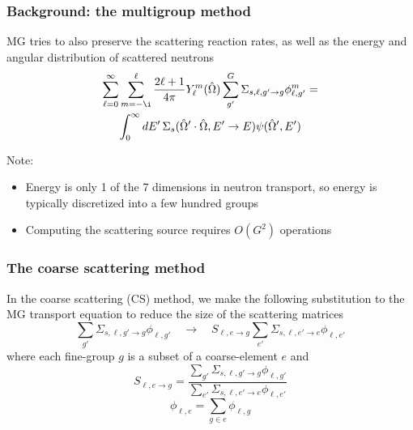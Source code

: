 \documentclass[xcolor=dvipsnames]{beamer}
\newlength{\wideitemsep}
\let\olditem\item
\renewcommand{\item}{\setlength{\itemsep}{\wideitemsep}\olditem}
\begin{document}
\begin{frame}
  \frametitle{Background: the multigroup method}

MG tries to also preserve the scattering reaction rates, as well as the energy and angular distribution of scattered neutrons
\begin{multline*}
 \sum_{\ell=0}^\infty \sum_{m=-\i}^\ell \frac{2 \ell + 1}{4 \pi} Y_\ell^m(\hat{\Omega}) \sum_{g'}^G \Sigma_{s,\ell, g' \to g} \phi_{\ell,g'}^m = \\ \int_0^\infty dE' \,\Sigma_s(\hat{\Omega}' \cdot \hat{\Omega},E' \to E) \psi(\hat{\Omega}',E')
\end{multline*}

Note:
\begin{itemize}
\item Energy is only 1 of the 7 dimensions in neutron transport, so energy is typically discretized into a few hundred groups
\item Computing the scattering source requires $O(G^2)$ operations
\end{itemize}


\end{frame}


\begin{frame}
\frametitle{The coarse scattering method}

In the coarse scattering (CS) method, we make the following substitution to the MG transport equation to reduce the size of the scattering matrices
\begin{equation*}
\label{eq:scatter}
\sum_{g'} \Sigma_{s,\ell,g'\to g} \phi_{\ell,g'} \quad \to \quad S_{\ell,e\to g} \sum_{e'} \Sigma_{s,\ell,e'\to e} \phi_{\ell,e'} 
\end{equation*}
where each fine-group $g$ is a subset of a coarse-element $e$ and
\begin{equation*}
\label{Eq.S}
S_{\ell,e\to g}  = \frac{\sum_{g'} \Sigma_{s,\ell,g'\to g} \phi_{\ell,g'}}{ \sum_{e'} \Sigma_{s,\ell,e'\to e} \phi_{\ell,e'}} 
\end{equation*}
\begin{equation*}
\phi_{\ell,e} = \sum_{g \in e} \phi_{\ell,g} 
\end{equation*}

\end{frame}
\end{document}
